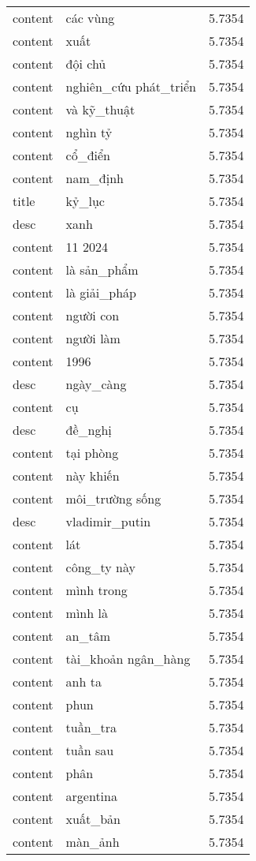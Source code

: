 \documentclass{article}
\begin{document}
\begin{tabular}{lll}
content & các vùng & 5.7354\\
content & xuất & 5.7354\\
content & đội chủ & 5.7354\\
content & nghiên\_cứu phát\_triển & 5.7354\\
content & và kỹ\_thuật & 5.7354\\
content & nghìn tỷ & 5.7354\\
content & cổ\_điển & 5.7354\\
content & nam\_định & 5.7354\\
title & kỷ\_lục & 5.7354\\
desc & xanh & 5.7354\\
content & 11 2024 & 5.7354\\
content & là sản\_phẩm & 5.7354\\
content & là giải\_pháp & 5.7354\\
content & người con & 5.7354\\
content & người làm & 5.7354\\
content & 1996 & 5.7354\\
desc & ngày\_càng & 5.7354\\
content & cụ & 5.7354\\
desc & đề\_nghị & 5.7354\\
content & tại phòng & 5.7354\\
content & này khiến & 5.7354\\
content & môi\_trường sống & 5.7354\\
desc & vladimir\_putin & 5.7354\\
content & lát & 5.7354\\
content & công\_ty này & 5.7354\\
content & mình trong & 5.7354\\
content & mình là & 5.7354\\
content & an\_tâm & 5.7354\\
content & tài\_khoản ngân\_hàng & 5.7354\\
content & anh ta & 5.7354\\
content & phun & 5.7354\\
content & tuần\_tra & 5.7354\\
content & tuần sau & 5.7354\\
content & phân & 5.7354\\
content & argentina & 5.7354\\
content & xuất\_bản & 5.7354\\
content & màn\_ảnh & 5.7354\\

\end{tabular}
\end{document}
